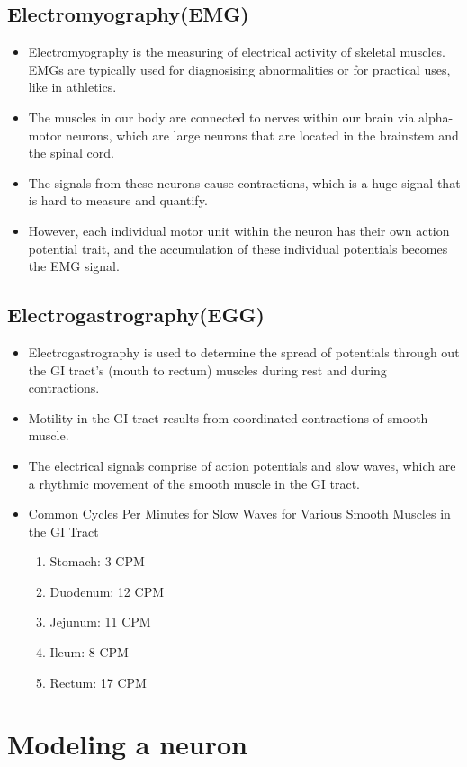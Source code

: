 \documentclass[11pt]{book}
\begin{document}
\subsection{Electromyography(EMG)}
\begin{itemize}
	\item Electromyography is the measuring of electrical activity of skeletal muscles. EMGs are typically used for diagnosising abnormalities or for practical uses, like in athletics.
	\item The muscles in our body are connected to nerves within our brain via alpha-motor neurons, which are large neurons that are located in the brainstem and the spinal cord.
	\item The signals from these neurons cause contractions, which is a huge signal that is hard to measure and quantify. 
	\item However, each individual motor unit within the neuron has their own action potential trait, and the accumulation of these individual potentials becomes the EMG signal.
\end{itemize}

\subsection{Electrogastrography(EGG)}
\begin{itemize}
	\item Electrogastrography is used to determine the spread of potentials through out the GI tract's (mouth to rectum) muscles during rest and during contractions.
	\item Motility in the GI tract results from coordinated contractions of smooth muscle.
	\item The electrical signals comprise of action potentials and slow waves, which are a rhythmic movement of the smooth muscle in the GI tract.
	\item Common Cycles Per Minutes for Slow Waves for Various Smooth Muscles in the GI Tract
	\begin{enumerate}
		\item Stomach: 3 CPM
		\item Duodenum: 12 CPM
		\item Jejunum: 11 CPM
		\item Ileum: 8 CPM
		\item Rectum: 17 CPM
	\end{enumerate}
\end{itemize}

\section{Modeling a neuron}

\end{document}
